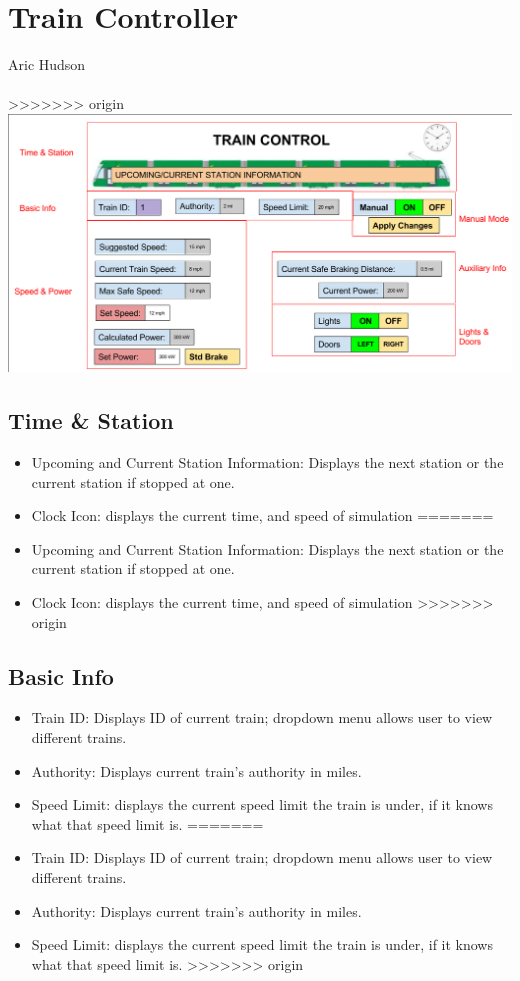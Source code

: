 \documentclass{scrreprt}
\begin{document}
\chapter{Train Controller}
\Large{Aric Hudson}\\\\
>>>>>>> origin
\includegraphics[width=\textwidth]{tc}

\section{Time \& Station}
\begin{itemize}
<<<<<<< HEAD
	\item Upcoming and Current Station Information: Displays the next station or the current station if stopped at one.
	\item Clock Icon: displays the current time, and speed of simulation
=======
    \item Upcoming and Current Station Information: Displays the next station or the current station if stopped at one.
    \item Clock Icon: displays the current time, and speed of simulation
>>>>>>> origin
\end{itemize}

\section{Basic Info}
\begin{itemize}
<<<<<<< HEAD
	\item Train ID: Displays ID of current train; dropdown menu allows user to view different trains.
	\item Authority: Displays current train's authority in miles.
	\item Speed Limit: displays the current speed limit the train is under, if it knows what that speed limit is.
=======
    \item Train ID: Displays ID of current train; dropdown menu allows user to view different trains.
    \item Authority: Displays current train's authority in miles.
    \item Speed Limit: displays the current speed limit the train is under, if it knows what that speed limit is.
>>>>>>> origin
\end{itemize}
\end{document}
